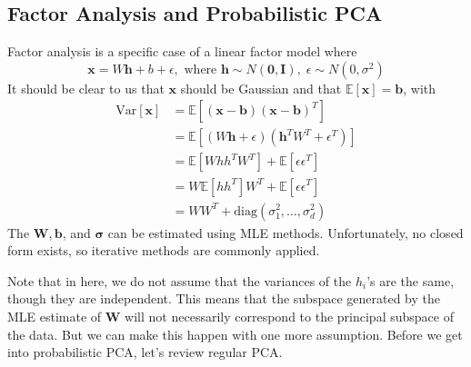 \documentclass{article}
\begin{document}
  \subsection{Factor Analysis and Probabilistic PCA}

    \begin{example} 
    Factor analysis is a specific case of a linear factor model where 
    \[\mathbf{x} = W \mathbf{h} + b + \epsilon, \text{ where } \mathbf{h} \sim N(\mathbf{0}, \mathbf{I}), \; \epsilon \sim N(0, \sigma^2)\] 
    It should be clear to us that $\mathbf{x}$ should be Gaussian and that $\mathbb{E}[\mathbf{x}] = \mathbf{b}$, with 
    \begin{align*} 
        \mathrm{Var}[\mathbf{x}] & = \mathbb{E}[ (\mathbf{x} - \mathbf{b})( \mathbf{x} - \mathbf{b})^T ] \\
                                 & = \mathbb{E}[ (W \mathbf{h} + \epsilon) (\mathbf{h}^T W^T + \epsilon^T)] \\
                                 & = \mathbb{E}[W h h^T W^T] + \mathbb{E}[ \epsilon \epsilon^T] \\
                                 & = W \mathbb{E}[ h h^T] W^T + \mathbb{E}[ \epsilon \epsilon^T] \\
                                 & = W W^T + \mathrm{diag}(\sigma_1^2, \ldots, \sigma_d^2) 
    \end{align*} 
    The $\mathbf{W}, \mathbf{b}$, and $\boldsymbol{\sigma}$ can be estimated using MLE methods. Unfortunately, no closed form  exists, so iterative methods are commonly applied. 
    \end{example} 

    Note that in here, we do not assume that the variances of the $h_i$'s are the same, though they are independent. This means that the subspace generated by the MLE estimate of $\mathbf{W}$ will not necessarily correspond to the principal subspace of the data. But we can make this happen with one more assumption. Before we get into probabilistic PCA, let's review regular PCA. 

    \begin{example}[PCA] 
        
    \end{example} 
\end{document}

